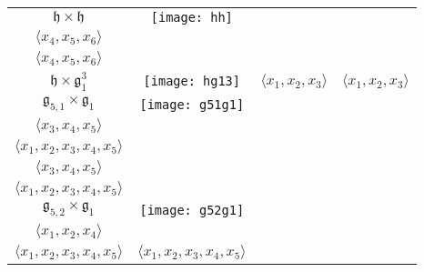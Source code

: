\documentclass[12pt]{amsart}
\begin{document}
\begin{table}[h]
\begin{tabular}{|c|c|c|c|}
$\mathfrak{h}\times\mathfrak{h}$  &  	\begin{minipage}{3cm}\vspace{0.1cm}\texttt{[image: hh]}\end{minipage} &
\begin{minipage}{2cm}$\langle x_1,x_2,x_3\rangle$\\$\langle x_4,x_5,x_6\rangle$\end{minipage}&
\begin{minipage}{2cm}$\langle x_1,x_2,x_3\rangle$\\$\langle x_4,x_5,x_6\rangle$\end{minipage}\\ \hline
$\mathfrak{h}\times\mathfrak{g}_1^3$  &  	\begin{minipage}{3cm}\vspace{0.1cm}\texttt{[image: hg13]}\end{minipage}& 
$\langle x_1,x_2,x_3\rangle$ & $\langle x_1,x_2,x_3\rangle$ \\ \hline
$\mathfrak{g}_{5,1}\times\mathfrak{g}_1$  &  	\begin{minipage}{4.5cm}\vspace{0.1cm}\texttt{[image: g51g1]}\end{minipage}& 
\begin{minipage}{3.2cm}\begin{center}$\langle x_1,x_2,x_5\rangle$\\$\langle x_3,x_4,x_5\rangle$\\$\langle x_1,x_2,x_3,x_4,x_5\rangle$\end{center}\end{minipage}& 
\begin{minipage}{3.2cm}\begin{center}$\langle x_1,x_2,x_5\rangle$\\$\langle x_3,x_4,x_5\rangle$\\$\langle x_1,x_2,x_3,x_4,x_5\rangle$\end{center}\end{minipage}\\ \hline
$\mathfrak{g}_{5,2}\times\mathfrak{g}_1$  &  	\begin{minipage}{3cm}\vspace{0.1cm}\texttt{[image: g52g1]}\vspace{0.2cm}\end{minipage} & \begin{minipage}{3.2cm}\begin{center}$\langle x_1,x_3,x_5\rangle$\\$\langle x_1,x_2,x_4\rangle$\\$\langle x_1,x_2,x_3,x_4,x_5\rangle$\end{center}\end{minipage}&
$\langle x_1,x_2,x_3,x_4,x_5\rangle$\\ \hline
\end{tabular}
\end{table}
\end{document}
